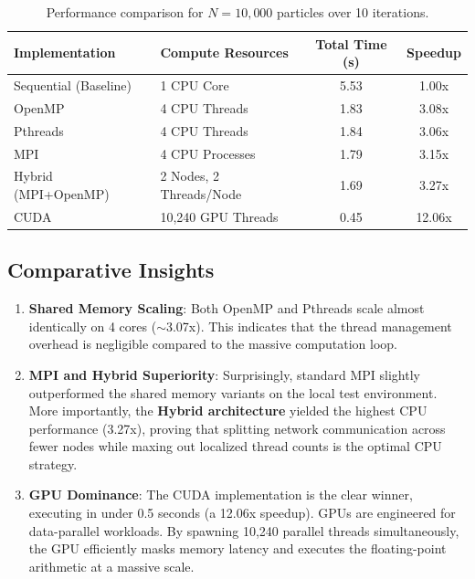 \documentclass[12pt,a4paper,titlepage]{article}
\begin{document}
\begin{table}[H]
\centering
\begin{tabular}{@{}llcc@{}}
\toprule
\textbf{Implementation} & \textbf{Compute Resources} & \textbf{Total Time (s)} & \textbf{Speedup} \\ \midrule
Sequential (Baseline)   & 1 CPU Core                 & 5.53                    & 1.00x            \\
OpenMP                  & 4 CPU Threads              & 1.83                    & 3.08x            \\
Pthreads                & 4 CPU Threads              & 1.84                    & 3.06x            \\
MPI                     & 4 CPU Processes            & 1.79                    & 3.15x            \\
Hybrid (MPI+OpenMP)     & 2 Nodes, 2 Threads/Node    & 1.69                    & 3.27x            \\
CUDA                    & 10,240 GPU Threads         & 0.45                    & 12.06x           \\ \bottomrule
\end{tabular}
\caption{Performance comparison for $N=10,000$ particles over 10 iterations.}
\label{tab:performance}
\end{table}

\subsection{Comparative Insights}
\begin{enumerate}
    \item \textbf{Shared Memory Scaling}: Both OpenMP and Pthreads scale almost identically on 4 cores ($\sim$3.07x). This indicates that the thread management overhead is negligible compared to the massive computation loop.
    \item \textbf{MPI and Hybrid Superiority}: Surprisingly, standard MPI slightly outperformed the shared memory variants on the local test environment. More importantly, the \textbf{Hybrid architecture} yielded the highest CPU performance (3.27x), proving that splitting network communication across fewer nodes while maxing out localized thread counts is the optimal CPU strategy.
    \item \textbf{GPU Dominance}: The CUDA implementation is the clear winner, executing in under 0.5 seconds (a 12.06x speedup). GPUs are engineered for data-parallel workloads. By spawning 10,240 parallel threads simultaneously, the GPU efficiently masks memory latency and executes the floating-point arithmetic at a massive scale.
\end{enumerate}
\end{document}
